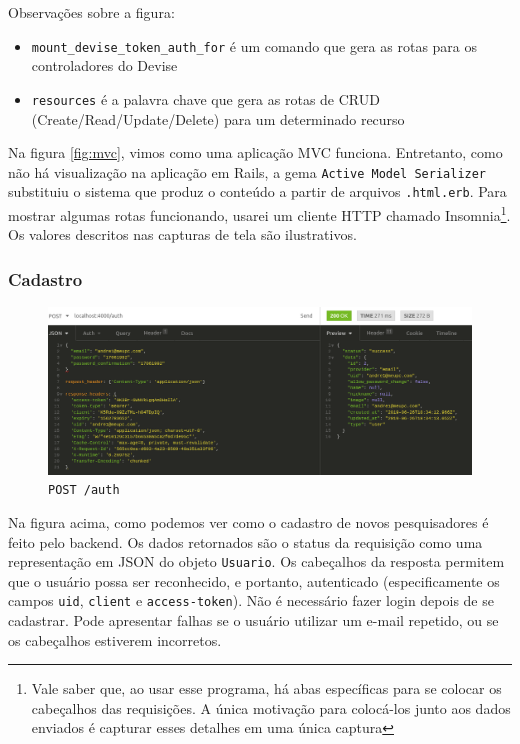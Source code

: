 Observações sobre a figura:
\begin{itemize}
  \item \texttt{mount\_devise\_token\_auth\_for} é um comando que gera as rotas para os controladores do Devise
  \item \texttt{resources} é a palavra chave que gera as rotas de CRUD (Create/Read/Update/Delete) para um determinado
  recurso
\end{itemize}

Na figura \ref{fig:mvc}, vimos como uma aplicação MVC funciona. Entretanto, como não há visualização na aplicação em Rails,
a gema \texttt{Active Model Serializer} substituiu o sistema que produz o conteúdo a partir de arquivos \texttt{.html.erb}.
Para mostrar algumas rotas funcionando, usarei um cliente HTTP chamado Insomnia\footnote{Vale saber que, ao usar esse
programa, há abas específicas para se colocar os cabeçalhos das requisições. A única motivação para colocá-los junto aos
dados enviados é capturar esses detalhes em uma única captura}. Os valores descritos nas capturas de tela são ilustrativos.

\subsubsection{Cadastro}

\begin{figure}[ht]
  \centering
  \includegraphics[width=.75\textwidth]{figuras/sign-up.png}
  \caption{\texttt{POST /auth}}
  \label{fig:sign-up}
\end{figure}

Na figura acima, como podemos ver como o cadastro de novos pesquisadores é feito pelo backend. Os dados retornados são
o status da requisição como uma representação em JSON do objeto \texttt{Usuario}. Os cabeçalhos da resposta permitem que
o usuário possa ser reconhecido, e portanto, autenticado (especificamente os campos \texttt{uid}, \texttt{client} e
\texttt{access-token}). Não é necessário fazer login depois de se cadastrar. Pode apresentar falhas se o usuário utilizar
um e-mail repetido, ou se os cabeçalhos estiverem incorretos.

